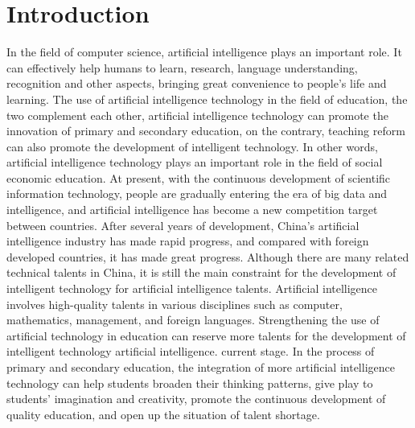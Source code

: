 \documentclass[11pt,en,authoryear]{elegantpaper}
\begin{document}
  \section{Introduction}
  In the field of computer science, artificial intelligence plays an important role. It can effectively help humans to learn, research, language understanding, recognition and other aspects, bringing great convenience to people's life and learning. The use of artificial intelligence technology in the field of education, the two complement each other, artificial intelligence technology can promote the innovation of primary and secondary education, on the contrary, teaching reform can also promote the development of intelligent technology. In other words, artificial intelligence technology plays an important role in the field of social economic education.
  At present, with the continuous development of scientific information technology, people are gradually entering the era of big data and intelligence, and artificial intelligence has become a new competition target between countries. After several years of development, China's artificial intelligence industry has made rapid progress, and compared with foreign developed countries, it has made great progress. Although there are many related technical talents in China, it is still the main constraint for the development of intelligent technology for artificial intelligence talents. Artificial intelligence involves high-quality talents in various disciplines such as computer, mathematics, management, and foreign languages. Strengthening the use of artificial technology in education can reserve more talents for the development of intelligent technology artificial intelligence. current stage. In the process of primary and secondary education, the integration of more artificial intelligence technology can help students broaden their thinking patterns, give play to students' imagination and creativity, promote the continuous development of quality education, and open up the situation of talent shortage.
  
\end{document}
